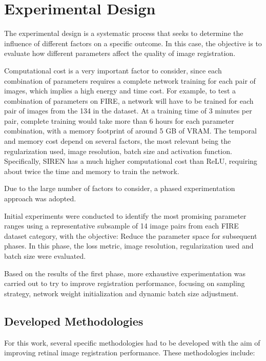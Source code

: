\section{Experimental Design}
\label{sec:Diseño de Experimentos}

The experimental design is a systematic process that seeks to determine the influence of different factors on a specific outcome. In this case, the objective is to evaluate how different parameters affect the quality of image registration.

Computational cost is a very important factor to consider, since each combination of parameters requires a complete network training for each pair of images, which implies a high energy and time cost.
For example, to test a combination of parameters on FIRE, a network will have to be trained for each pair of images from the 134 in the dataset.
At a training time of 3 minutes per pair, complete training would take more than 6 hours for each parameter combination, with a memory footprint of around 5 GB of VRAM.
The temporal and memory cost depend on several factors, the most relevant being the regularization used, image resolution, batch size and activation function.
Specifically, SIREN has a much higher computational cost than ReLU, requiring about twice the time and memory to train the network.

Due to the large number of factors to consider, a phased experimentation approach was adopted.

Initial experiments were conducted to identify the most promising parameter ranges using a representative subsample of 14 image pairs from each FIRE dataset category, with the objective: Reduce the parameter space for subsequent phases.
In this phase, the loss metric, image resolution, regularization used and batch size were evaluated.

Based on the results of the first phase, more exhaustive experimentation was carried out to try to improve registration performance, focusing on sampling strategy, network weight initialization and dynamic batch size adjustment.

\subsection{Developed Methodologies}
\label{subsec:Metodoloxías Desenvoltas}

For this work, several specific methodologies had to be developed with the aim of improving retinal image registration performance. These methodologies include:

